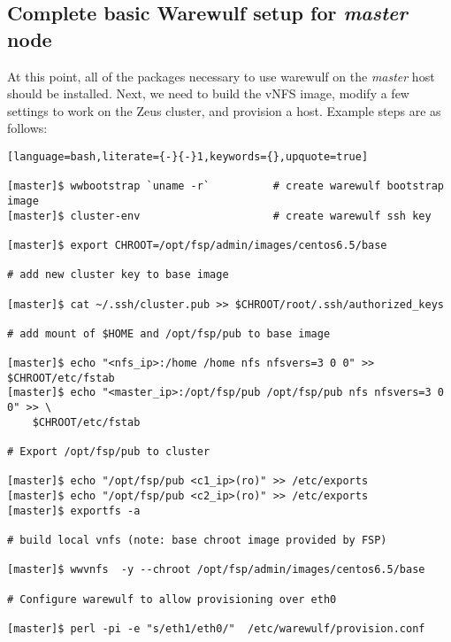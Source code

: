 \documentclass[letterpaper]{article}
\begin{document}

\subsection{Complete basic Warewulf setup for {\em master} node}

At this point, all of the packages necessary to use warewulf on the {\em master}
host should be installed.  Next, we need to build the vNFS image, modify a few
settings to work on the Zeus cluster, and provision a host. Example steps are
as follows:

\vspace*{0.2cm}


\begin{lstlisting}[language=bash,literate={-}{-}1,keywords={},upquote=true]

[master]$ wwbootstrap `uname -r`          # create warewulf bootstrap image
[master]$ cluster-env                     # create warewulf ssh key

[master]$ export CHROOT=/opt/fsp/admin/images/centos6.5/base

# add new cluster key to base image

[master]$ cat ~/.ssh/cluster.pub >> $CHROOT/root/.ssh/authorized_keys

# add mount of $HOME and /opt/fsp/pub to base image

[master]$ echo "<nfs_ip>:/home /home nfs nfsvers=3 0 0" >> $CHROOT/etc/fstab
[master]$ echo "<master_ip>:/opt/fsp/pub /opt/fsp/pub nfs nfsvers=3 0 0" >> \
    $CHROOT/etc/fstab

# Export /opt/fsp/pub to cluster

[master]$ echo "/opt/fsp/pub <c1_ip>(ro)" >> /etc/exports
[master]$ echo "/opt/fsp/pub <c2_ip>(ro)" >> /etc/exports
[master]$ exportfs -a

# build local vnfs (note: base chroot image provided by FSP)

[master]$ wwvnfs  -y --chroot /opt/fsp/admin/images/centos6.5/base

# Configure warewulf to allow provisioning over eth0

[master]$ perl -pi -e "s/eth1/eth0/"  /etc/warewulf/provision.conf 
\end{lstlisting}
\end{document}
